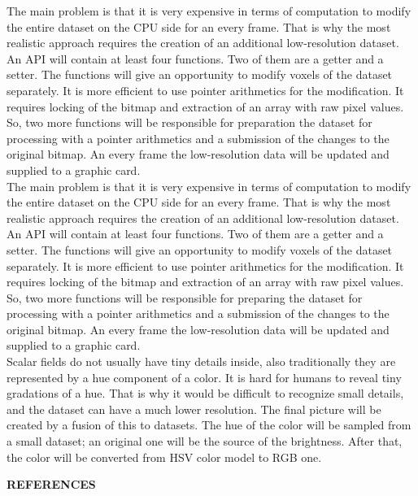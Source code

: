\documentclass[twoside, english, 11pt]{report}
\begin{document}
The main problem is that it is very expensive in terms of computation to modify the entire dataset on the CPU side for an every frame. That is why the most realistic approach requires the creation of an additional low-resolution dataset. An API will contain at least four functions. Two of them are a getter and a setter. The functions will give an opportunity to modify voxels of the dataset separately. It is more efficient to use pointer arithmetics for the modification. It requires locking of the bitmap and extraction of an array with raw pixel values. So, two more functions will be responsible for preparation the dataset for processing with a pointer arithmetics and a submission of the changes to the original bitmap. An every frame the low-resolution data will be updated and supplied to a graphic card. \\
The main problem is that it is very expensive in terms of computation to modify the entire dataset on the CPU side for an every frame. That is why the most realistic approach requires the creation of an additional low-resolution dataset. An API will contain at least four functions. Two of them are a getter and a setter. The functions will give an opportunity to modify voxels of the dataset separately. It is more efficient to use pointer arithmetics for the modification. It requires locking of the bitmap and extraction of an array with raw pixel values. So, two more functions will be responsible for preparing the dataset for processing with a pointer arithmetics and a submission of the changes to the original bitmap. An every frame the low-resolution data will be updated and supplied to a graphic card. \\

Scalar fields do not usually have tiny details inside, also traditionally they are represented by a hue component of a color. It is hard for humans to reveal tiny gradations of a hue. That is why it would be difficult to recognize small details, and the dataset can have a much lower resolution. The final picture will be created by a fusion of this to datasets. The hue of the color will be sampled from a small dataset; an original one will be the source of the brightness. After that, the color will be converted from HSV color model to RGB one.


\newpage

\LARGE \textbf{REFERENCES}\\
\end{document}
